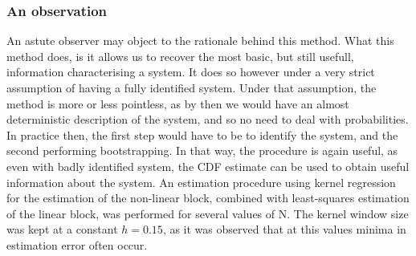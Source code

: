 \subsubsection{An observation}
An astute observer may object to the rationale behind this method. What this method does, is it allows us to recover the most basic, but still usefull, information characterising a system. It does so however under a very strict assumption of having a fully identified system. Under that assumption, the method is more or less pointless, as by then we would have an almost deterministic description of the system, and so no need to deal with probabilities. 
In practice then, the first step would have to be to identify the system, and the second performing bootstrapping. 
In that way, the procedure is again useful, as even with badly identified system, the CDF estimate can be used to obtain useful information about the system.
An estimation procedure using kernel regression for the estimation of the non-linear block, combined with least-squares estimation of the linear block, was performed for several values of N. The kernel window size was kept at a constant $h = 0.15$, as it was observed that at this values minima in estimation error often occur.



